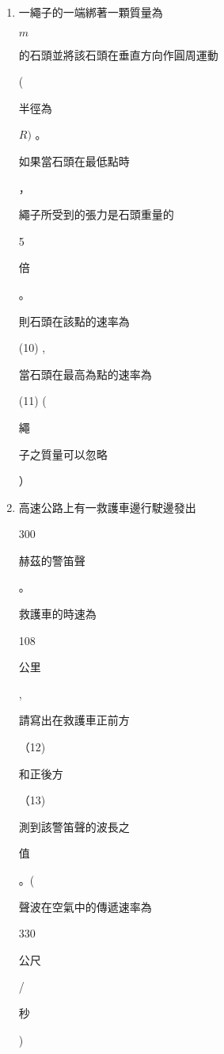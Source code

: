 \documentclass[10pt]{article}
\begin{document}
\begin{enumerate}
  \item \begin{CJK}{UTF8}{mj}一繩子的一端綁著一顆質量為\end{CJK} $m$ \begin{CJK}{UTF8}{mj}的石頭並將該石頭在垂直方向作圓周運動\end{CJK} (\begin{CJK}{UTF8}{mj}半徑為\end{CJK} $R)$ 。\begin{CJK}{UTF8}{mj}如果當石頭在最低點時\end{CJK}，\begin{CJK}{UTF8}{mj}繩子所受到的張力是石頭重量的\end{CJK} 5 \begin{CJK}{UTF8}{mj}倍\end{CJK}。 \begin{CJK}{UTF8}{mj}則石頭在該點的速率為\end{CJK} (10) , \begin{CJK}{UTF8}{mj}當石頭在最高為點的速率為\end{CJK} (11) (\begin{CJK}{UTF8}{mj}繩\end{CJK} \begin{CJK}{UTF8}{mj}子之質量可以忽略\end{CJK}）

  \item \begin{CJK}{UTF8}{mj}高速公路上有一救護車邊行駛邊發出\end{CJK} 300 \begin{CJK}{UTF8}{mj}赫茲的警笛聲\end{CJK}。\begin{CJK}{UTF8}{mj}救護車的時速為\end{CJK} 108 \begin{CJK}{UTF8}{mj}公里\end{CJK}, \begin{CJK}{UTF8}{mj}請寫出在救護車正前方\end{CJK}（12) \begin{CJK}{UTF8}{mj}和正後方\end{CJK}（13) \begin{CJK}{UTF8}{mj}測到該警笛聲的波長之\end{CJK} \begin{CJK}{UTF8}{mj}值\end{CJK}。(\begin{CJK}{UTF8}{mj}聲波在空氣中的傳遞速率為\end{CJK} 330 \begin{CJK}{UTF8}{mj}公尺\end{CJK}/\begin{CJK}{UTF8}{mj}秒\end{CJK})


\end{enumerate}
\end{document}
